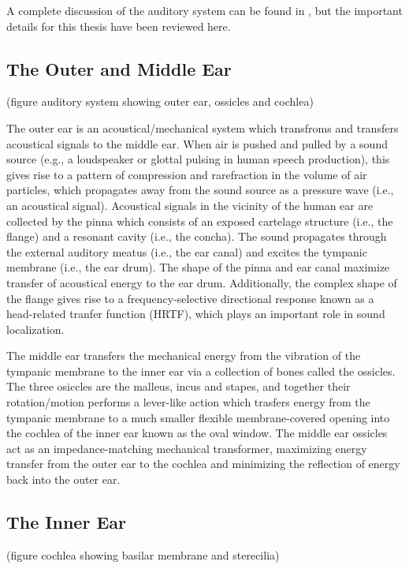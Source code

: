 A complete discussion of the auditory system can be found in \cite{pickles2013}, but the important details for this thesis have been reviewed here.

\subsection{The Outer and Middle Ear}

(figure auditory system showing outer ear, ossicles and cochlea)

The outer ear is an acoustical/mechanical system which transfroms and transfers acoustical signals to the middle ear. When air is pushed and pulled by a sound source (e.g., a loudspeaker or glottal pulsing in human speech production), this gives rise to a pattern of compression and rarefraction in the volume of air particles, which propagates away from the sound source as a pressure wave (i.e., an acoustical signal). Acoustical signals in the vicinity of the human ear are collected by the pinna which consists of an exposed cartelage structure (i.e., the flange) and a resonant cavity (i.e., the concha). The sound propagates through the external auditory meatus (i.e., the ear canal) and excites the tympanic membrane (i.e., the ear drum). The shape of the pinna and ear canal maximize transfer of acoustical energy to the ear drum. Additionally, the complex shape of the flange gives rise to a frequency-selective directional response known as a head-related tranfer function (HRTF), which plays an important role in sound localization.

The middle ear transfers the mechanical energy from the vibration of the tympanic membrane to the inner ear via a collection of bones called the ossicles. The three osiccles are the malleus, incus and stapes, and together their rotation/motion performs a lever-like action which trasfers energy from the tympanic membrane to a much smaller flexible membrane-covered opening into the cochlea of the inner ear known as the oval window. The middle ear ossicles act as an impedance-matching mechanical transformer, maximizing energy transfer from the outer ear to the cochlea and minimizing the reflection of energy back into the outer ear.

\subsection{The Inner Ear}

(figure cochlea showing basilar membrane and sterecilia)

